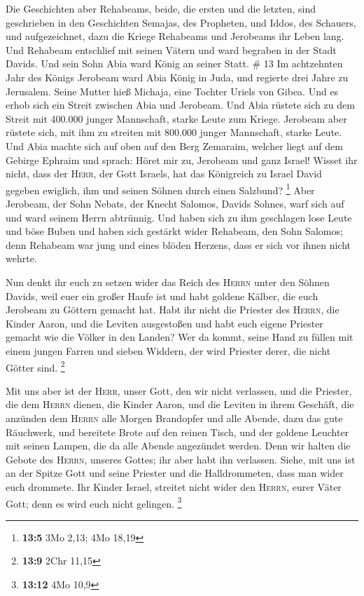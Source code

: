  Die Geschichten aber Rehabeams, beide, die ersten und
die letzten, sind geschrieben in den Geschichten Semajas, des Propheten,
und Iddos, des Schauers, und aufgezeichnet, dazu die Kriege Rehabeams
und Jerobeams ihr Leben lang.  Und Rehabeam entschlief
mit seinen Vätern und ward begraben in der Stadt Davids. Und sein Sohn
Abia ward König an seiner Statt. \# 13  Im achtzehnten
Jahr des Königs Jerobeam ward Abia König in Juda,  und
regierte drei Jahre zu Jerusalem. Seine Mutter hieß Michaja, eine
Tochter Uriels von Gibea. Und es erhob sich ein Streit zwischen Abia und
Jerobeam.  Und Abia rüstete sich zu dem Streit mit 400.000
junger Mannschaft, starke Leute zum Kriege. Jerobeam aber rüstete sich,
mit ihm zu streiten mit 800.000 junger Mannschaft, starke Leute.
 Und Abia machte sich auf oben auf den Berg Zemaraim,
welcher liegt auf dem Gebirge Ephraim und sprach: Höret mir zu, Jerobeam
und ganz Israel!  Wisset ihr nicht, dass der
\textsc{Herr}, der Gott Israels, hat das Königreich zu Israel David
gegeben ewiglich, ihm und seinen Söhnen durch einen Salzbund?
\footnote{\textbf{13:5} 3Mo 2,13; 4Mo 18,19}  Aber
Jerobeam, der Sohn Nebats, der Knecht Salomos, Davids Sohnes, warf sich
auf und ward seinem Herrn abtrünnig.  Und haben sich zu
ihm geschlagen lose Leute und böse Buben und haben sich gestärkt wider
Rehabeam, den Sohn Salomos; denn Rehabeam war jung und eines blöden
Herzens, dass er sich vor ihnen nicht wehrte.

 Nun denkt ihr euch zu setzen wider das Reich des
\textsc{Herrn} unter den Söhnen Davids, weil euer ein großer Haufe ist
und habt goldene Kälber, die euch Jerobeam zu Göttern gemacht hat.
 Habt ihr nicht die Priester des \textsc{Herrn}, die
Kinder Aaron, und die Leviten ausgestoßen und habt euch eigene Priester
gemacht wie die Völker in den Landen? Wer da kommt, seine Hand zu füllen
mit einem jungen Farren und sieben Widdern, der wird Priester derer, die
nicht Götter sind. \footnote{\textbf{13:9} 2Chr 11,15}

 Mit uns aber ist der \textsc{Herr}, unser Gott, den wir
nicht verlassen, und die Priester, die dem \textsc{Herrn} dienen, die
Kinder Aaron, und die Leviten in ihrem Geschäft,  die
anzünden dem \textsc{Herrn} alle Morgen Brandopfer und alle Abende, dazu
das gute Räuchwerk, und bereitete Brote auf den reinen Tisch, und der
goldene Leuchter mit seinen Lampen, die da alle Abende angezündet
werden. Denn wir halten die Gebote des \textsc{Herrn}, unseres Gottes;
ihr aber habt ihn verlassen.  Siehe, mit uns ist an der
Spitze Gott und seine Priester und die Halldrommeten, dass man wider
euch drommete. Ihr Kinder Israel, streitet nicht wider den
\textsc{Herrn}, eurer Väter Gott; denn es wird euch nicht gelingen.
\footnote{\textbf{13:12} 4Mo 10,9}

